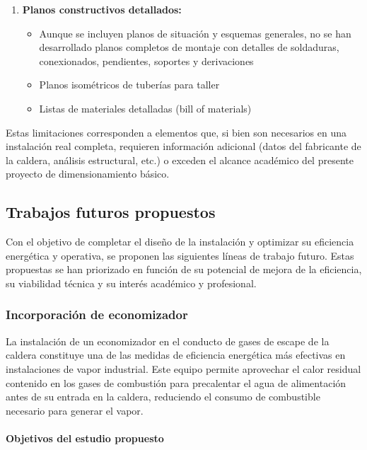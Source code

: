 \begin{enumerate}[label=\arabic*., leftmargin=2em]
	\item \textbf{Planos constructivos detallados:}
	      \begin{itemize}[noitemsep]
		      \item Aunque se incluyen planos de situación y esquemas generales, no se han desarrollado planos completos de montaje con detalles de soldaduras, conexionados, pendientes, soportes y derivaciones
		      \item Planos isométricos de tuberías para taller
		      \item Listas de materiales detalladas (bill of materials)
	      \end{itemize}
\end{enumerate}

Estas limitaciones corresponden a elementos que, si bien son necesarios en una instalación real completa, requieren información adicional (datos del fabricante de la caldera, análisis estructural, etc.) o exceden el alcance académico del presente proyecto de dimensionamiento básico.

\subsection{Trabajos futuros propuestos}
\label{subsec:trabajos-futuros}

Con el objetivo de completar el diseño de la instalación y optimizar su eficiencia energética y operativa, se proponen las siguientes líneas de trabajo futuro. Estas propuestas se han priorizado en función de su potencial de mejora de la eficiencia, su viabilidad técnica y su interés académico y profesional.

\subsubsection{Incorporación de economizador}
\label{subsubsec:trabajo-futuro-economizador}

La instalación de un economizador en el conducto de gases de escape de la caldera constituye una de las medidas de eficiencia energética más efectivas en instalaciones de vapor industrial. Este equipo permite aprovechar el calor residual contenido en los gases de combustión para precalentar el agua de alimentación antes de su entrada en la caldera, reduciendo el consumo de combustible necesario para generar el vapor.

\paragraph{Objetivos del estudio propuesto}

